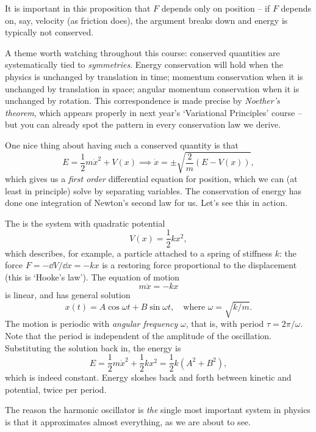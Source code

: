 \documentclass[a4paper]{scrartcl}
\begin{document}
It is important in this proposition that $F$ depends only on position -- if $F$ depends on, say, velocity (as friction does), the argument breaks down and energy is typically not conserved.

\begin{remark}
	A theme worth watching throughout this course: conserved quantities are systematically tied to \emph{symmetries}. Energy conservation will hold when the physics is unchanged by translation in time; momentum conservation when it is unchanged by translation in space; angular momentum conservation when it is unchanged by rotation. This correspondence is made precise by \emph{Noether's theorem}, which appears properly in next year's `Variational Principles' course -- but you can already spot the pattern in every conservation law we derive.
\end{remark}

One nice thing about having such a conserved quantity is that
$$
E = \frac{1}{2}m \dot{x}^2 + V(x) \implies  \dot{x} = \pm \sqrt{\frac{2}{m} (E - V(x))},
$$
which gives us a \emph{first order} differential equation for position, which we can (at least in principle) solve by separating variables. The conservation of energy has done one integration of Newton's second law for us. Let's see this in action.

\begin{example}
	The  is the system with quadratic potential
	$$
	V(x) = \frac{1}{2}k x^2,
	$$
	which describes, for example, a particle attached to a spring of stiffness $k$: the force $F = -\dd V/\dd x = -kx$ is a restoring force proportional to the displacement (this is `Hooke's law').
	The equation of motion
	$$
	m \ddot{x} = -kx
	$$
	is linear, and has general solution
	$$
	x(t) = A \cos \omega t + B \sin \omega t, \quad \text{where } \omega = \sqrt{k/m}.
	$$
	The motion is periodic with \emph{angular frequency} $\omega$, that is, with period $\tau = 2\pi/\omega$. Note that the period is independent of the amplitude of the oscillation.
	Substituting the solution back in, the energy is
	$$
	E = \frac{1}{2}m\dot{x}^2 + \frac{1}{2}kx^2 = \frac{1}{2}k(A^2 + B^2),
	$$
	which is indeed constant. Energy sloshes back and forth between kinetic and potential, twice per period.
\end{example}

The reason the harmonic oscillator is \emph{the} single most important system in physics is that it approximates almost everything, as we are about to see.
\end{document}
